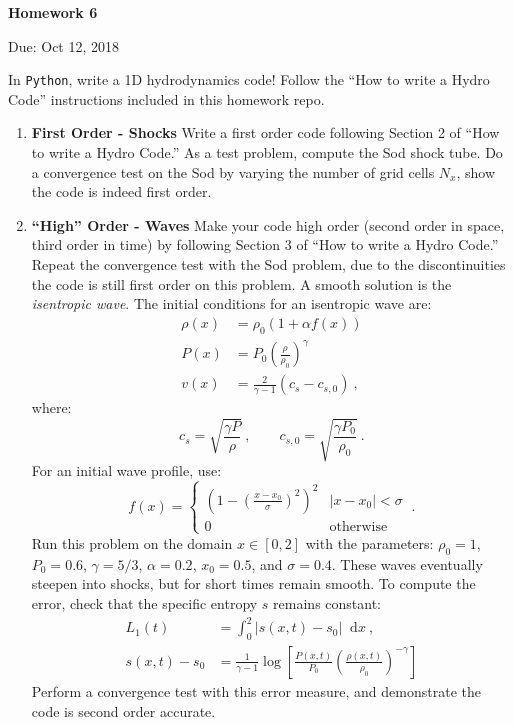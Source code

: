 \documentclass{article}
\newcommand{\Python}{{\texttt{Python}}}
\newcommand*\diff{\mathop{}\!\mathrm{d}}
\begin{document}
\begin{center}

\vspace*{-2.5cm}
\LARGE
\bf{Homework 6}
\vspace{1cm}

\large{Due: Oct 12, 2018}
\vspace{1cm}

\end{center}

In \Python{}, write a 1D hydrodynamics code!  Follow the ``How to write a Hydro Code'' instructions included in this homework repo.

\begin{enumerate}
	\item {\bf First Order - Shocks} 
		Write a first order code following Section 2 of ``How to write a Hydro Code.'' As a test problem, compute the Sod shock tube.  Do a convergence test on the Sod by varying the number of grid cells $N_x$, show the code is indeed first order.
	\item {\bf ``High'' Order - Waves} 
		Make your code high order (second order in space, third order in time) by following Section 3 of  ``How to write a Hydro Code.''  Repeat the convergence test with the Sod problem, due to the discontinuities the code is still first order on this problem.  A smooth solution is the \emph{isentropic wave}.  The initial conditions for an isentropic wave are:
		\begin{align}
			\rho(x) &= \rho_0 \left( 1 + \alpha f(x) \right) \\
			P(x) &= P_0 \left(\frac{\rho}{\rho_0}\right)^\gamma \\
			v(x) &= \frac{2}{\gamma-1} \left( c_s - c_{s,0} \right) \ ,
		\end{align}
		where:
		\begin{equation}
			c_s = \sqrt{\frac{\gamma P}{\rho}} \ , \qquad c_{s,0} = \sqrt{\frac{\gamma P_0}{\rho_0}} \ .
		\end{equation}
		For an initial wave profile, use:
		\begin{equation}
			f(x) = \left \{ \begin{matrix} 
						\left(1-\left(\frac{x-x_0}{\sigma}\right)^2\right)^2 & |x-x_0| < \sigma \\
						0 & \text{otherwise}
					\end{matrix} \right . \ .
		\end{equation}
		Run this problem on the domain $x \in [0,2]$ with the parameters: $\rho_0 = 1$, $P_0=0.6$, $\gamma=5/3$, $\alpha=0.2$, $x_0=0.5$, and $\sigma=0.4$.  
		These waves eventually steepen into shocks, but for short times remain smooth.  To compute the error, check that the specific entropy $s$ remains constant:
		\begin{align}
			L_1(t) & = \int_0^2 |s(x,t) - s_0| \diff x \ , \\
			s(x,t)-s_0 &= \frac{1}{\gamma-1} \log \left[\frac{P(x,t)}{P_0} \left(\frac{\rho(x,t)}{\rho_0}\right)^{-\gamma}\right]
		\end{align}
		Perform a convergence test with this error measure, and demonstrate the code is second order accurate.
\end{enumerate}
\end{document}
